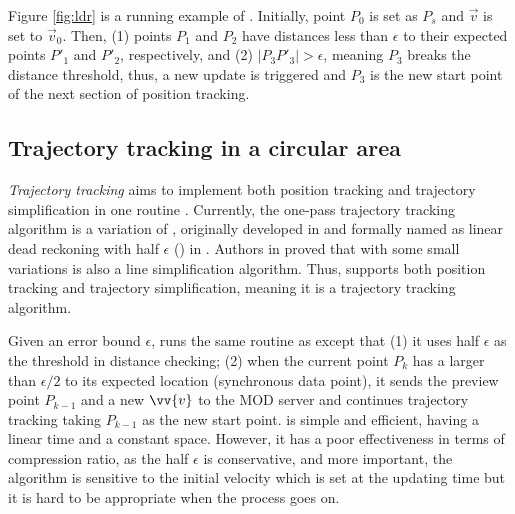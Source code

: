 \begin{example}
	\label{exm-ldr}
Figure \ref{fig:ldr} is a running example of \ldr.
Initially, point $P_0$ is set as $P_s$ and $\vec{v}$ is set to $\vec{v}_0$. Then, (1) points $P_1$ and $P_2$ have \sed distances less than $\epsilon$ to their expected points $P'_1$ and $P'_2$, respectively, and (2) $|P_3P'_3| > \epsilon$, meaning $P_3$ breaks the distance threshold, thus, a new update is triggered and $P_3$ is the new start point of the next section of position tracking.
%
\end{example}


 




\subsection{Trajectory tracking in a circular area}
\textit{Trajectory tracking} aims to implement both position tracking and trajectory simplification in one routine \cite{Lange:Tracking}. Currently, the one-pass trajectory tracking algorithm is a variation of \ldr, originally developed in \cite{Trajcevski:LDRH} and formally named as linear dead reckoning with half $\epsilon$ (\ldrh) in \cite{Lange:Tracking}.
%
Authors in \cite{Trajcevski:LDRH} proved that \ldr with some small variations is also a line simplification algorithm. Thus, \ldrh supports both position tracking and trajectory simplification, meaning it is a trajectory tracking algorithm.

Given an error bound $\epsilon$, \ldrh runs the same routine as \ldr except that (1) it uses half $\epsilon$ as the threshold in distance checking; (2) when the current point $P_k$ has a \sed larger than $\epsilon/2$ to its expected location (synchronous data point), it sends the preview point $P_{k-1}$ and a new $\vv{v}$ to the MOD server and continues trajectory tracking taking $P_{k-1}$ as the new start point. \ldrh is simple and efficient, having a linear time and a constant space. However, it has a poor effectiveness in terms of compression ratio, as the half $\epsilon$ is conservative, and more important, the algorithm is sensitive to the initial velocity which is set at the updating time but it is hard to be appropriate when the process goes on.

